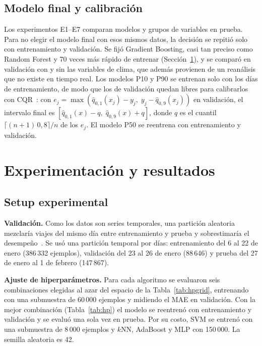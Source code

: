 \documentclass[conference,a4paper]{IEEEtran}
\begin{document}
\subsection{Modelo final y calibración}
Los experimentos E1--E7 comparan modelos y grupos de variables en prueba. Para no elegir el modelo final con esos mismos datos, la decisión se repitió solo con entrenamiento y validación. Se fijó Gradient Boosting, casi tan preciso como Random Forest y 70 veces más rápido de entrenar (Sección~\ref{sec:exp}), y se comparó en validación con y sin las variables de clima, que además provienen de un reanálisis que no existe en tiempo real. Los modelos P10 y P90 se entrenan solo con los días de entrenamiento, de modo que los de validación quedan libres para calibrarlos con CQR~\cite{romano2019}: con $e_j = \max(\hat{q}_{0{,}1}(x_j) - y_j,\; y_j - \hat{q}_{0{,}9}(x_j))$ en validación, el intervalo final es $[\hat{q}_{0{,}1}(x) - q,\; \hat{q}_{0{,}9}(x) + q]$, donde $q$ es el cuantil $\lceil (n+1)\,0{,}8 \rceil / n$ de los $e_j$. El modelo P50 se reentrena con entrenamiento y validación.

\section{Experimentación y resultados}\label{sec:exp}

\subsection{Setup experimental}
\textbf{Validación.} Como los datos son series temporales, una partición aleatoria mezclaría viajes del mismo día entre entrenamiento y prueba y sobrestimaría el desempeño~\cite{bergmeir2012}. Se usó una partición temporal por días: entrenamiento del 6 al 22 de enero (386\,332 ejemplos), validación del 23 al 26 de enero (88\,646) y prueba del 27 de enero al 1 de febrero (147\,867).

\textbf{Ajuste de hiperparámetros.} Para cada algoritmo se evaluaron seis combinaciones elegidas al azar del espacio de la Tabla~\ref{tab:hpgrid}, entrenando con una submuestra de 60\,000 ejemplos y midiendo el MAE en validación. Con la mejor combinación (Tabla~\ref{tab:hp}) el modelo se reentrenó con entrenamiento y validación y se evaluó una sola vez en prueba. Por su costo, SVM se entrenó con una submuestra de 8\,000 ejemplos y $k$NN, AdaBoost y MLP con 150\,000. La semilla aleatoria es 42.
\end{document}
